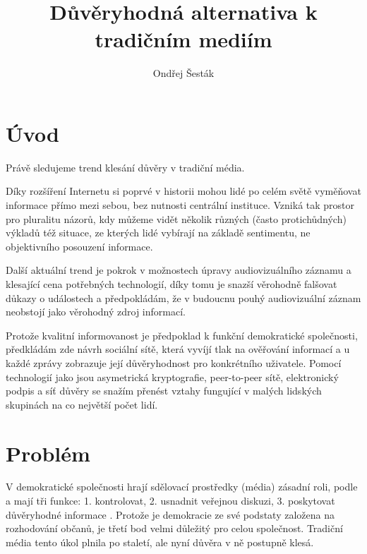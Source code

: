 \documentclass[a4papper]{article}
\begin{document}
\title{Důvěryhodná alternativa k tradičním mediím}
\author{Ondřej Šesták}
\maketitle

\tableofcontents

\section{Úvod}
\label{ch:uvod}

Právě sledujeme trend klesání důvěry v tradiční média.

Díky rozšíření Internetu si poprvé v historii mohou lidé po celém světě vyměňovat informace přímo mezi sebou, bez nutnosti centrální instituce. Vzniká tak prostor pro pluralitu názorů, kdy můžeme vidět několik různých (často protichůdných) výkladů též situace, ze kterých lidé vybírají na základě sentimentu, ne objektivního posouzení informace.

Další aktuální trend je pokrok v možnostech úpravy audiovizuálního záznamu a klesající cena potřebných technologií, díky tomu je snazší věrohodně falšovat důkazy o událostech a předpokládám, že v budoucnu pouhý audiovizuální záznam neobstojí jako věrohodný zdroj informací.

Protože kvalitní informovanost je předpoklad k funkční demokratické společnosti, předkládám zde návrh sociální sítě, která vyvíjí tlak na ověřování informací a u každé zprávy zobrazuje její důvěryhodnost pro konkrétního uživatele. Pomocí technologií jako jsou asymetrická kryptografie, peer-to-peer sítě, elektronický podpis a síť důvěry se snažím přenést vztahy fungující v malých lidských skupinách na co největší počet lidí.

\section{Problém}
\label{ch:problem}

V demokratické společnosti hrají sdělovací prostředky (média) zásadní roli, podle \citeauthor{netanel01}a mají tři funkce: 1. kontrolovat, 2. usnadnit veřejnou diskuzi, 3. poskytovat důvěryhodné informace \citep{netanel01}. Protože je demokracie ze své podstaty založena na rozhodování občanů, je třetí bod velmi důležitý pro celou společnost. Tradiční média tento úkol plnila po staletí, ale nyní důvěra v ně postupně klesá.
\end{document}

